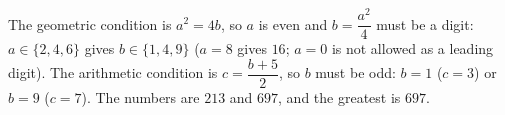 The geometric condition is $a^2=4b$, so $a$ is even and $b=\dfrac{a^2}{4}$ must be a digit: $a\in\{2,4,6\}$ gives $b\in\{1,4,9\}$ ($a=8$ gives $16$; $a=0$ is not allowed as a leading digit). The arithmetic condition is $c=\dfrac{b+5}{2}$, so $b$ must be odd: $b=1$ ($c=3$) or $b=9$ ($c=7$). The numbers are $213$ and $697$, and the greatest is $\boxed{697}$.
